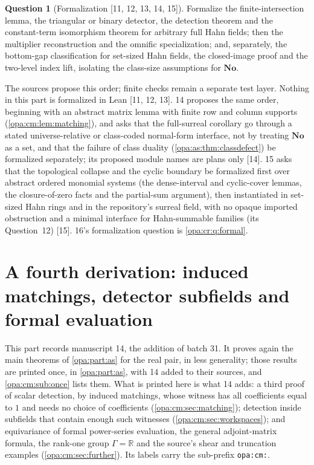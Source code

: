 \documentclass[11pt,oneside]{article}
\numberwithin{equation}{section}
\theoremstyle{definition}
\newtheorem{question}[question]{Question}
\theoremstyle{remark}
\newcommand{\No}{\mathbf{No}}
\newcommand{\R}{\mathbb R}
\newcommand{\src}[1]{\textup{\textsf{\small[#1]}}}
\newcommand{\lbl}[1]{\nolinkurl{#1}}
\begin{document}
\begin{question}[Formalization \src{11, 12, 13, 14, 15}]\label{opa:as:q:formal}
Formalize the finite-intersection lemma, the triangular or binary detector, the detection theorem and the
constant-term isomorphism theorem for arbitrary full Hahn fields; then the multiplier reconstruction and the omnific
specialization; and, separately, the bottom-gap classification for set-sized Hahn fields, the closed-image proof and the
two-level index lift, isolating the class-size assumptions for $\No$.
\end{question}
The sources propose this order; finite checks remain a separate test layer. Nothing in this part is formalized in Lean
\src{11, 12, 13}. 14 proposes the same order, beginning with an abstract matrix lemma with finite row and column
supports (\cref{opa:cm:lem:matching}), and asks that the full-surreal corollary go through a stated universe-relative
or class-coded normal-form interface, not by treating $\No$ as a set, and that the failure of class duality
(\cref{opa:as:thm:classdefect}) be formalized separately; its proposed module names are plans only \src{14}.
15 asks that the topological collapse and the cyclic boundary be formalized first over abstract ordered monomial
systems (the dense-interval and cyclic-cover lemmas, the closure-of-zero facts and the partial-sum argument), then
instantiated in set-sized Hahn rings and in the repository's surreal field, with no opaque imported obstruction and a
minimal interface for Hahn-summable families (its Question~12) \src{15}. 16's formalization question is
\cref{opa:cr:q:formal}.

\part{A fourth derivation: induced matchings, detector subfields and formal evaluation}\label{opa:cm:part}

This part records manuscript 14, the addition of batch 31. It proves again the main
theorems of \cref{opa:part:as} for the real pair, in less generality; those results are
printed once, in \cref{opa:part:as}, with 14 added to their sources, and
\cref{opa:cm:sub:once} lists them. What is printed here is what 14 adds: a third proof of
scalar detection, by induced matchings, whose witness has all coefficients equal to $1$
and needs no choice of coefficients (\cref{opa:cm:sec:matching}); detection inside subfields
that contain enough such witnesses (\cref{opa:cm:sec:workspaces}); and equivariance of
formal power-series evaluation, the general adjoint-matrix formula, the rank-one group
$\Gamma=\R$ and the source's shear and truncation examples
(\cref{opa:cm:sec:further}). Its labels carry the sub-prefix \lbl{opa:cm:}.
\end{document}

